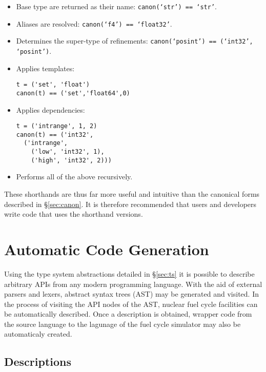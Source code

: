 \documentclass{ansconfpaper}
\newcommand{\vin}[1]{\texttt{{#1}}}
\begin{document}
\begin{itemize}
\item Base type are returned as their name: \vin{canon(`str') == `str'}.

\item Aliases are resolved: \vin{canon(`f4') == `float32'}.

\item Determines the super-type of refinements: \vin{canon(`posint') == 
    (`int32', `posint')}.

\item Applies templates:
\begin{lstlisting}
t = ('set', 'float')
canon(t) == ('set','float64',0)
\end{lstlisting}

\item Applies dependencies:
\begin{lstlisting}    
t = ('intrange', 1, 2)
canon(t) == ('int32', 
  ('intrange', 
    ('low', 'int32', 1), 
    ('high', 'int32', 2)))
\end{lstlisting}

\item Performs all of the above recursively.
\end{itemize}

These shorthands are thus far more useful and intuitive than the canonical forms 
described in \S \ref{sec:canon}.  It is therefore recommended that users and 
developers write code that uses the shorthand versions.

\section{Automatic Code Generation}
\label{sec:codegen}

Using the type system abstractions detailed in \S \ref{sec:ts} it is possible
to describe arbitrary APIs from any modern programming language.  With the aid
of external parsers and lexers, abstract syntax trees (AST) may be generated 
and visited.  In the process of visiting the API nodes of the AST, nuclear 
fuel cycle facilities can be automatically described.  Once a description is 
obtained, wrapper code from the source language to the lagunage of the fuel 
cycle simulator may also be automaticaly created.

\subsection{Descriptions}
\label{sec:desc}
\end{document}
